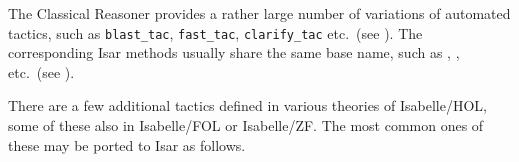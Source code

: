 \begin{isabellebody}
\begin{isamarkuptext}
\begin{tabular}{lll}
  \end{tabular}
  \medskip%
\end{isamarkuptext}%
\isamarkuptrue%
%
\isamarkuptrue%
%
\begin{isamarkuptext}%
The Classical Reasoner provides a rather large number of variations
  of automated tactics, such as \verb|blast_tac|, \verb|fast_tac|, \verb|clarify_tac| etc.\ (see \cite{isabelle-ref}).  The corresponding
  Isar methods usually share the same base name, such as \hyperlink{method.blast}{\mbox{}}, \hyperlink{method.fast}{\mbox{}}, \hyperlink{method.clarify}{\mbox{}} etc.\ (see
  ).%
\end{isamarkuptext}%
\isamarkuptrue%
%
\isamarkuptrue%
%
\begin{isamarkuptext}%
There are a few additional tactics defined in various theories of
  Isabelle/HOL, some of these also in Isabelle/FOL or Isabelle/ZF.
  The most common ones of these may be ported to Isar as follows.


\end{isamarkuptext}
\end{isabellebody}
